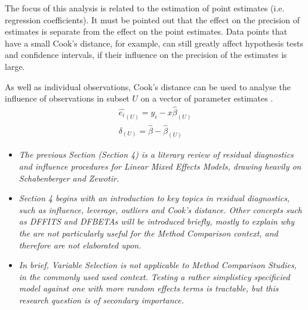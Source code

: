 \documentclass[12pt, a4paper]{article}
\begin{document}
The focus of this analysis is related to the estimation of point estimates (i.e. regression coefficients). It must be pointed out that the effect on the precision of estimates is separate from the effect on the point estimates. Data points that
have a small Cook's distance, for example, can still greatly affect hypothesis tests and confidence intervals, if their  influence on the precision of the estimates is large.

As well as individual observations, Cook's distance can be used to analyse the influence of observations in subset $U$ on a vector of parameter estimates \citep{cook77}.
\begin{eqnarray}
\hat{e_{i}}_{(U)} = y_{i} - x\hat{\beta}_{(U)}\\
\delta_{(U)} = \hat{\beta} - \hat{\beta}_{(U)}
\end{eqnarray}


\begin{itemize}
	\item \textit{
		The previous Section (Section 4) is a literary review of residual diagnostics and influence procedures
		for Linear Mixed Effects Models, drawing heavily on Schabenberger and Zewotir.}
	
	\item \textit{	Section 4 begins with an introduction to key topics in residual diagnostics, such as influence, leverage, outliers
		and Cook's distance. Other concepts such as DFFITS and DFBETAs will be introduced briefly, mostly to explain why the are not particularly useful for
		the Method Comparison context, and therefore are not elaborated upon.}
	
	\item \textit{	In brief, Variable Selection is not applicable to Method Comparison Studies, in the 
		commonly used used context. 
		Testing a rather simplisticy specificied model against one with more random effects terms is tractable, but this research question is of secondary importance.}
\end{itemize}
\end{document}
